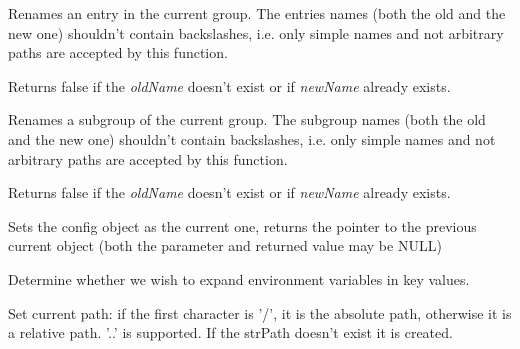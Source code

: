 \label{wxconfigbaserenameentry}


Renames an entry in the current group. The entries names (both the old and
the new one) shouldn't contain backslashes, i.e. only simple names and not
arbitrary paths are accepted by this function.

Returns false if the {\it oldName} doesn't exist or if {\it newName} already
exists.


\label{wxconfigbaserenamegroup}


Renames a subgroup of the current group. The subgroup names (both the old and
the new one) shouldn't contain backslashes, i.e. only simple names and not
arbitrary paths are accepted by this function.

Returns false if the {\it oldName} doesn't exist or if {\it newName} already
exists.


\label{wxconfigbaseset}


Sets the config object as the current one, returns the pointer to the previous
current object (both the parameter and returned value may be NULL)


\label{wxconfigbasesetexpandenvvars}


Determine whether we wish to expand environment variables in key values.


\label{wxconfigbasesetpath}


Set current path: if the first character is '/', it is the absolute path,
otherwise it is a relative path. '..' is supported. If the strPath doesn't
exist it is created.


\label{wxconfigbasesetrecorddefaults}



